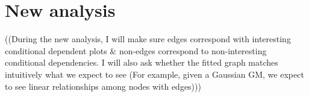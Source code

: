 \section{New analysis}
\label{sec:usage:newanalysis}

((During the new analysis, I will make sure edges correspond with interesting conditional dependent plots \& non-edges correspond to non-interesting conditional dependencies. I will also ask whether the fitted graph matches intuitively what we expect to see (For example, given a Gaussian GM, we expect to see linear relationships among nodes with edges)))